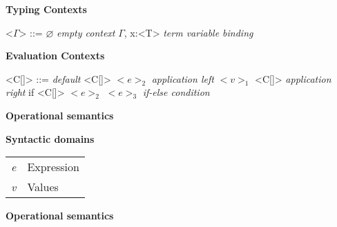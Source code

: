 \documentclass[11pt,oneside]{book}
\newcommand{\synlabel}[1]{\hfill \textit{#1}}
\begin{document}
\textbf{Typing Contexts}

\begin{grammar}

    <$\Gamma$> ::=  $\varnothing$                        \synlabel{empty context}
               \alt \syntleft $\Gamma$\syntright, x:<T>  \synlabel{term variable binding}

\end{grammar}

\textbf{Evaluation Contexts}

\begin{grammar}

    <C[\textbullet]> ::=  \textbullet                          \synlabel{default}
                     \alt <C[\textbullet]> $<e>_2$             \synlabel{application left}
                     \alt $<v>_1$ <C[\textbullet]>             \synlabel{application right}
                     \alt if <C[\textbullet]> $<e>_2$ $<e>_3$  \synlabel{if-else condition}

\end{grammar}

\hfill
\begin{center}
{
    \bf
    \huge
    Operational semantics
}
\end{center}

\textbf{Syntactic domains}

\begin{tabular}{ l l }
    \textit{e} & Expression \\
    \textit{v} & Values \\
\end{tabular}

\hfill\break

\textbf{Operational semantics}

\begin{center}
\end{center}

\begin{prooftree}
\end{prooftree}
\end{document}
